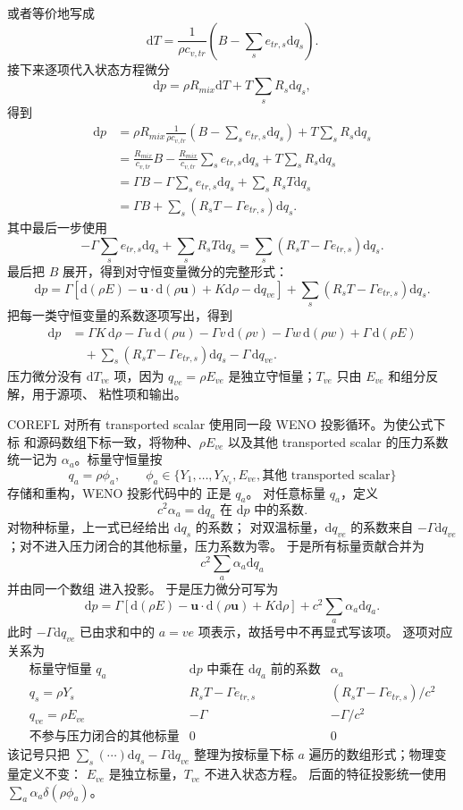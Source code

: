 \documentclass[11pt,a4paper,fontset=fandol]{ctexart}
\newcommand{\dd}{\mathrm{d}}
\newcommand{\ve}{ve}
\newcommand{\tr}{tr}
\newcommand{\uu}{\bm{u}}
\newcommand{\Gammaone}{\Gamma}
\newcommand{\code}[1]{\texttt{\seqsplit{#1}}}
\begin{document}
或者等价地写成
\[
\dd T
=\frac{1}{\rho c_{v,\tr}}\left(B-\sum_s e_{\tr,s}\dd q_s\right).
\]
接下来逐项代入状态方程微分
\[
\dd p=\rho R_{mix}\dd T+T\sum_sR_s\dd q_s,
\]
得到
\[
\begin{aligned}
\dd p
&=\rho R_{mix}
\frac{1}{\rho c_{v,\tr}}
\left(B-\sum_s e_{\tr,s}\dd q_s\right)
+T\sum_sR_s\dd q_s\\
&=\frac{R_{mix}}{c_{v,\tr}}B
-\frac{R_{mix}}{c_{v,\tr}}\sum_s e_{\tr,s}\dd q_s
+T\sum_sR_s\dd q_s\\
&=\Gammaone B
 -\Gammaone\sum_s e_{\tr,s}\dd q_s
 +\sum_sR_sT\dd q_s\\
&=\Gammaone B
+\sum_s\left(R_sT-\Gammaone e_{\tr,s}\right)\dd q_s .
\end{aligned}
\]
其中最后一步使用
\[
-\Gammaone\sum_s e_{\tr,s}\dd q_s
+\sum_sR_sT\dd q_s
=\sum_s\left(R_sT-\Gammaone e_{\tr,s}\right)\dd q_s .
\]
最后把 \(B\) 展开，得到对守恒变量微分的完整形式：
\[
\boxed{
\dd p
=\Gammaone\left[\dd(\rho E)-\uu\cdot\dd(\rho\uu)+K\dd\rho-\dd q_{\ve}\right]
+\sum_s\left(R_sT-\Gammaone e_{\tr,s}\right)\dd q_s .
}
\]
把每一类守恒变量的系数逐项写出，得到
\[
\begin{aligned}
\dd p
&=\Gammaone K\,\dd\rho
  -\Gammaone u\,\dd(\rho u)
  -\Gammaone v\,\dd(\rho v)
  -\Gammaone w\,\dd(\rho w)
  +\Gammaone\,\dd(\rho E)\\
&\quad
  +\sum_s\left(R_sT-\Gammaone e_{\tr,s}\right)\dd q_s
  -\Gammaone\,\dd q_{\ve}.
\end{aligned}
\]
压力微分没有 \(\dd T_{\ve}\) 项，因为 \(q_{\ve}=\rho E_{\ve}\)
是独立守恒量；\(T_{\ve}\) 只由 \(E_{\ve}\) 和组分反解，用于源项、
粘性项和输出。

COREFL 对所有 transported scalar 使用同一段 WENO 投影循环。为使公式下标
和源码数组下标一致，将物种、\(\rho E_{\ve}\) 以及其他 transported scalar
的压力系数统一记为 \(\alpha_a\)。标量守恒量按
\[
q_a=\rho\phi_a,\qquad
\phi_a\in\{Y_1,\ldots,Y_{N_s},E_{\ve},\text{其他 transported scalar}\}
\]
存储和重构，WENO 投影代码中的 \code{Q[5+a]} 正是 \(q_a\)。
对任意标量 \(q_a\)，定义
\[
\boxed{c^2\alpha_a=
\text{\(\dd q_a\) 在 \(\dd p\) 中的系数}} .
\]
对物种标量，上一式已经给出 \(\dd q_s\) 的系数；
对双温标量，\(\dd q_{\ve}\) 的系数来自
\(-\Gammaone\dd q_{\ve}\)；对不进入压力闭合的其他标量，压力系数为零。
于是所有标量贡献合并为
\[
c^2\sum_a\alpha_a\dd q_a
\]
并由同一个数组 \code{scalar\_alpha[a]} 进入投影。
于是压力微分可写为
\[
\dd p
=\Gammaone\left[\dd(\rho E)-\uu\cdot\dd(\rho\uu)+K\dd\rho\right]
+c^2\sum_a\alpha_a\dd q_a.
\]
此时 \(-\Gammaone\dd q_{\ve}\) 已由求和中的
\(a=\ve\) 项表示，故括号中不再显式写该项。
逐项对应关系为
\[
\begin{array}{c|c|c}
\text{标量守恒量 }q_a & \text{\(\dd p\) 中乘在 \(\dd q_a\) 前的系数}
& \alpha_a\\ \hline
q_s=\rho Y_s
& R_sT-\Gammaone e_{\tr,s}
& (R_sT-\Gammaone e_{\tr,s})/c^2\\
q_{\ve}=\rho E_{\ve}
& -\Gammaone
& -\Gammaone/c^2\\
\text{不参与压力闭合的其他标量}
& 0
& 0
\end{array}
\]
该记号只把
\(\sum_s(\cdots)\dd q_s-\Gammaone\dd q_{\ve}\)
整理为按标量下标 \(a\) 遍历的数组形式；物理变量定义不变：
\(E_{\ve}\) 是独立标量，\(T_{\ve}\) 不进入状态方程。
后面的特征投影统一使用 \(\sum_a\alpha_a\delta(\rho\phi_a)\)。
\end{document}

